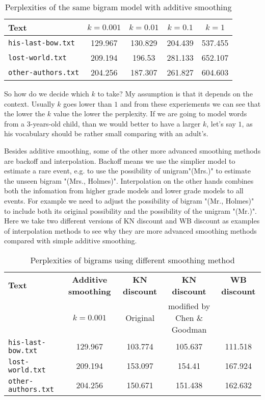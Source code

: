 \documentclass[11pt]{article} %
\begin{document}
\begin{table}[h!]
    \begin{center}
      \caption{Perplexities of the same bigram model with additive smoothing}
      \label{tab:table1}
      \begin{tabular}{l|c|c|c|c}
        \textbf{Text} & \textbf{$k=0.001$} & \textbf{$k=0.01$} & \textbf{$k=0.1$} & \textbf{$k=1$}\\
        \hline
        \texttt{his-last-bow.txt} & 129.967 & 130.829 & 204.439 & 537.455\\
        \texttt{lost-world.txt} & 209.194 & 196.53 & 281.133 & 652.107\\
        \texttt{other-authors.txt} & 204.256 & 187.307 & 261.827 & 604.603\\
      \end{tabular}
    \end{center}
  \end{table}

So how do we decide which $k$ to take? My assumption is that it depends on the context. Usually $k$ goes lower than $1$ and from these experiements we can see that the lower the $k$ value the lower the perplexity. If we are going to model words from a 3-years-old child, than we would better to have a larger $k$, let's say $1$, as his vocabulary should be rather small comparing with an adult's.

Besides additive smoothing, some of the other more advanced smoothing methods are backoff and interpolation. Backoff means we use the simplier model to estimate a rare event, e.g. to use the possibility of unigram"(Mrs.)" to estimate the unseen bigram "(Mrs., Holmes)". Interpolation on the other hands combines both the infomation from higher grade models and lower grade models to all events. For example we need to adjust the possibility of bigram "(Mr., Holmes)" to include both its original possibility and the possibility of the unigram "(Mr.)". Here we take two different versions of KN discount and WB discount as examples of interpolation methods to see why they are more advanced smoothing methods compared with simple additive smoothing.

\begin{sidewaystable}[h!]
    \begin{center}
      \caption{Perplexities of bigrams using different smoothing method}
      \label{tab:table2}
      \begin{tabular}{l|c|c|c|c}
        \textbf{Text} & \textbf{Additive smoothing} & \textbf{KN discount} & \textbf{KN discount} & \textbf{WB discount}\\
        & $k=0.001$ & Original & modified by Chen \& Goodman \\
        \hline
        \texttt{his-last-bow.txt} & 129.967 & 103.774 & 105.637 & 111.518\\
        \texttt{lost-world.txt} & 209.194 & 153.097 & 154.41 & 167.924\\
        \texttt{other-authors.txt} & 204.256 & 150.671 & 151.438 & 162.632\\
      \end{tabular}
    \end{center}
  \end{sidewaystable}
\end{document}
